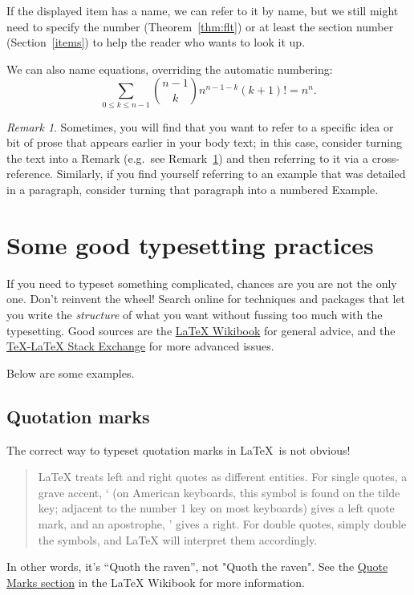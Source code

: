 \documentclass[11pt]{amsart}
\theoremstyle{theorem} %
\theoremstyle{definition}                  %
\theoremstyle{example}                       %
\theoremstyle{remark}                       %
\newtheorem{rem}[thm]{Remark}
\numberwithin{equation}{section}
\begin{document}
If the displayed item has a name, we can refer to it by name, but we still might need to specify the number (Theorem~\ref{thm:flt})  or at least the section number (Section~\ref{items}) to help the reader who wants to look it up.

We can also name equations, overriding the automatic numbering: 
\begin{equation}
\sum_{0 \leq k \leq n-1} {{n-1}\choose{k}} n^{n-1-k} (k+1)! = n^n \tag{Key Eq.}.
\end{equation}

\begin{rem} \label{rmk:rmk}
Sometimes, you will find that you want to refer to a specific idea or bit of prose that appears earlier in your body text; in this case, consider turning the text into a Remark (e.g.\ see Remark~\ref{rmk:rmk}) and then referring to it via a cross-reference. 
Similarly, if you find yourself referring to an example that was detailed in a paragraph, consider turning that paragraph into a numbered Example.
\end{rem}
\section{Some good typesetting practices}

If you need to typeset something complicated, chances are you are not the only one. Don't reinvent the wheel! 
Search online for techniques and packages  that let you write the \emph{structure} of what you want without fussing too much with the typesetting. 
Good sources are the \href{https://en.wikibooks.org/wiki/LaTeX}{LaTeX Wikibook} \cite{wikibook} for general advice, and the \href{https://tex.stackexchange.com/}{TeX-LaTeX Stack Exchange} for more advanced issues. 

Below are some examples. 

\subsection{Quotation marks}
The correct way to typeset quotation marks in \LaTeX\ is not obvious!
\begin{quotation}
LaTeX treats left and right quotes as different entities. For single quotes, a grave accent, ` (on American keyboards, this symbol is found on the tilde key; adjacent to the number 1 key on most keyboards) gives a left quote mark, and an apostrophe, ' gives a right. For double quotes, simply double the symbols, and LaTeX will interpret them accordingly. \cite[Chap. ``LaTeX/Text Formatting'', \S 3]{wikibook}
\end{quotation}
In other words, it's ``Quoth the raven'', not "Quoth the raven".  See the \href{https://en.wikibooks.org/wiki/LaTeX/Text_Formatting#Quote-marks}{Quote Marks section} in the LaTeX Wikibook \cite{wikibook} for more information.
\end{document}
